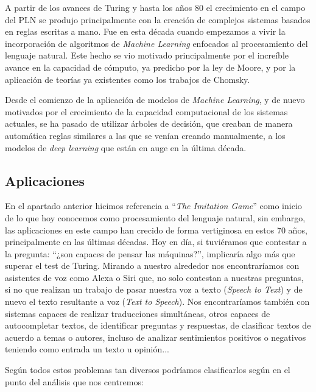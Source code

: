 A partir de los avances de Turing y hasta los años 80 el crecimiento en el campo del PLN se produjo principalmente con la creación de complejos sistemas basados en reglas escritas a mano. Fue en esta década cuando empezamos a vivir la incorporación de algoritmos de \textit{Machine Learning} enfocados al procesamiento del lenguaje natural. Este hecho se vio motivado principalmente por el increíble avance en la capacidad de cómputo, ya predicho por la ley de Moore, y por la aplicación de teorías ya existentes como los trabajos de Chomsky. 


Desde el comienzo de la aplicación de modelos de \textit{Machine Learning}, y de nuevo motivados por el crecimiento de la capacidad computacional de los sistemas actuales, se ha pasado de utilizar árboles de decisión, que creaban de manera automática reglas similares a las que se venían creando manualmente, a los modelos de \textit{deep learning} que están en auge en la última década. 

\subsection{Aplicaciones}

En el apartado anterior hicimos referencia a ``\textit{The Imitation Game}'' como inicio de lo que hoy conocemos como procesamiento del lenguaje natural, sin embargo, las aplicaciones en este campo han crecido de forma vertiginosa en estos 70 años, principalmente en las últimas décadas. Hoy en día, si tuviéramos que contestar a la pregunta: ``¿son capaces de pensar las máquinas?'', implicaría algo más que superar el test de Turing. Mirando a nuestro alrededor nos encontraríamos con asistentes de voz como Alexa o Siri que, no solo contestan a nuestras preguntas, si no que realizan un trabajo de pasar nuestra voz a texto (\textit{Speech to Text}) y de nuevo el texto resultante a voz (\textit{Text to Speech}). Nos encontraríamos también con sistemas capaces de realizar traducciones simultáneas, otros capaces de autocompletar textos, de identificar preguntas y respuestas, de clasificar textos de acuerdo a temas o autores, incluso de analizar sentimientos positivos o negativos teniendo como entrada un texto u opinión... 


Según \cite{goldberg_2017} todos estos problemas tan diversos podríamos clasificarlos según en el punto del análisis que nos centremos: 

